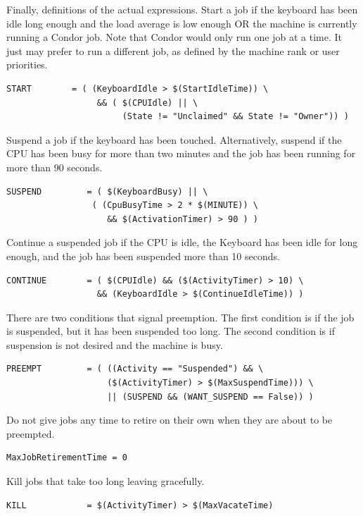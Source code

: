 Finally, definitions of the actual expressions.
Start a job if 
the keyboard has been idle long enough and
the load average is low enough OR the machine is currently
running a Condor job.
Note that Condor would only run one job at a time.
It just may prefer to run a different job, as defined by
the machine rank or user priorities.
\begin{verbatim}
START        = ( (KeyboardIdle > $(StartIdleTime)) \
                  && ( $(CPUIdle) || \
                       (State != "Unclaimed" && State != "Owner")) )
\end{verbatim}

Suspend a job if the keyboard has been touched.
Alternatively, suspend if the CPU has been busy for more than two minutes
and the job has been running for more than 90 seconds.
\begin{verbatim}
SUSPEND         = ( $(KeyboardBusy) || \
                 ( (CpuBusyTime > 2 * $(MINUTE)) \
                    && $(ActivationTimer) > 90 ) )
\end{verbatim}

Continue a suspended job if the CPU is idle, the Keyboard has been
idle for long enough, and the job has been suspended more
than 10 seconds.
\begin{verbatim}
CONTINUE        = ( $(CPUIdle) && ($(ActivityTimer) > 10) \
                  && (KeyboardIdle > $(ContinueIdleTime)) )
\end{verbatim}

There are two conditions that signal preemption.
The first condition is if the job is suspended,
but it has been suspended too long.
The second condition is if suspension is not desired and the machine is busy. 
\begin{verbatim}
PREEMPT	        = ( ((Activity == "Suspended") && \
                    ($(ActivityTimer) > $(MaxSuspendTime))) \
                    || (SUSPEND && (WANT_SUSPEND == False)) )
\end{verbatim}


Do not give jobs any time to retire on their own when they are about to
be preempted.

\begin{verbatim}
MaxJobRetirementTime = 0
\end{verbatim}


Kill jobs that take too long leaving gracefully.
\begin{verbatim}
KILL            = $(ActivityTimer) > $(MaxVacateTime)
\end{verbatim}

